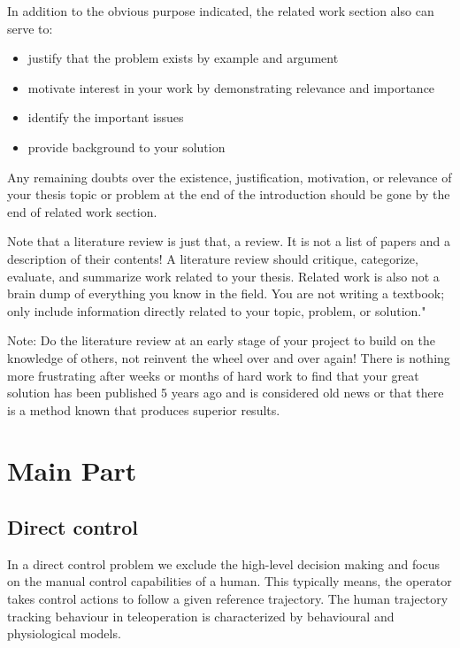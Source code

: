 \documentclass[a4paper,twoside, openright,12pt]{report}
\begin{document}
In addition to the obvious purpose indicated, the related work section also can serve to:

\begin{itemize}
	\item justify that the problem exists by example and argument
	\item motivate interest in your work by demonstrating relevance and importance
	\item identify the important issues
	\item provide background to your solution
\end{itemize}

Any remaining doubts over the existence, justification, motivation, or relevance of your thesis topic or problem at the end of the introduction should be gone by the end of related work section.

Note that a literature review is just that, a review. It is not a list of papers and a description of their contents! A literature review should critique, categorize, evaluate, and summarize work related to your thesis. Related work is also not a brain dump of everything you know in the field. You are not writing a textbook; only include information directly related to your topic, problem, or solution."

Note: Do the literature review at an early stage of your project to build on the knowledge of others, not reinvent the wheel over and over again! There is nothing more frustrating after weeks or months of hard work to find that your great solution has been published 5 years ago and is considered old news or that there is a method known that produces superior results.




\chapter{Main Part}
\section{Direct control}
In a direct control problem we exclude the high-level decision making and focus on the manual control capabilities of a human. This typically means, the operator takes control actions to follow a given reference trajectory. The human trajectory tracking behaviour in teleoperation is characterized by behavioural and physiological models. 
\end{document}
